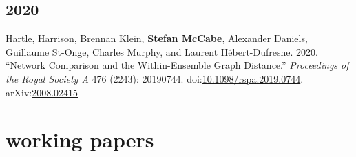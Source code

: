 \documentclass[11pt, letter]{article}
\begin{document}
\subsection{2020}
\begin{hangparas}{.25in}{1}
  Hartle, Harrison, Brennan Klein, \textbf{Stefan McCabe}, Alexander Daniels,
  Guillaume St-Onge, Charles Murphy, and Laurent Hébert-Dufresne. 2020.
  ``Network Comparison and the Within-Ensemble Graph Distance.''
  \textit{Proceedings of the Royal Society A} 476 (2243): 20190744.
  doi:\href{https://doi.org/10.1098/rspa.2019.0744}{10.1098/rspa.2019.0744}.
  arXiv:\href{https://arxiv.org/abs/2008.02415}{2008.02415} \vspace{2mm}
\end{hangparas}


\section{working papers}
\end{document}
